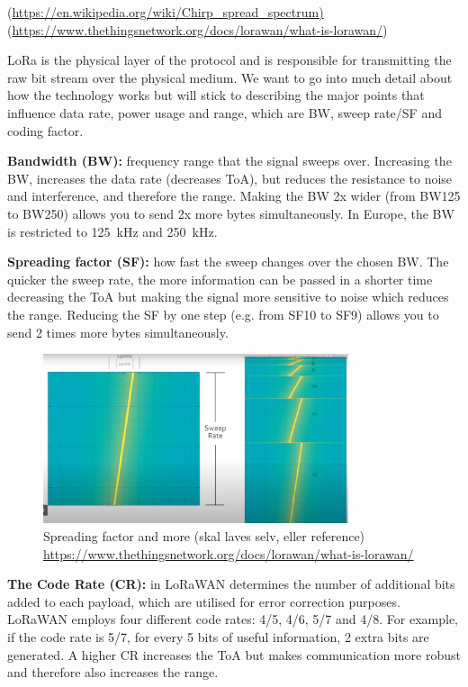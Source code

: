 (\url{https://en.wikipedia.org/wiki/Chirp_spread_spectrum)}
(\url{https://www.thethingsnetwork.org/docs/lorawan/what-is-lorawan/})

\ac{LoRa} is the physical layer of the protocol and is responsible for transmitting the raw bit stream over the physical medium.
We want to go into much detail about how the technology works but will stick to describing the major points that influence data rate, power usage and range, which are \ac{BW}, sweep rate/\ac{SF} and coding factor.

\textbf{Bandwidth (BW):} frequency range that the signal sweeps over. Increasing the \ac{BW}, increases the data rate (decreases \ac{ToA}), but reduces the resistance to noise and interference, and therefore the range. Making the \ac{BW} 2x wider (from BW125 to BW250) allows you to send 2x more bytes simultaneously.
In Europe, the \ac{BW} is restricted to \SI{125}{\kilo\hertz} and \SI{250}{\kilo\hertz}.

\textbf{Spreading factor (SF):} how fast the sweep changes over the chosen \ac{BW}. The quicker the sweep rate, the more information can be passed in a shorter time decreasing the \ac{ToA} but making the signal more sensitive to noise which reduces the range. Reducing the \ac{SF} by one step (e.g. from SF10 to SF9) allows you to send 2 times more bytes simultaneously.

\begin{figure}[H]
    \centering
    \includegraphics[width=0.8\textwidth]{figures/sweep_rate.png}
    \caption{Spreading factor and more (skal laves selv, eller reference) \url{https://www.thethingsnetwork.org/docs/lorawan/what-is-lorawan/}}
    \label{fig:spread_rate}
\end{figure}

\textbf{The Code Rate (CR):} in \ac{LoRaWAN} determines the number of additional bits added to each payload, which are utilised for error correction purposes. \ac{LoRaWAN} employs four different code rates: 4/5, 4/6, 5/7 and 4/8.
For example, if the code rate is 5/7, for every 5 bits of useful information, 2 extra bits are generated. A higher \ac{CR} increases the \ac{ToA} but makes communication more robust and therefore also increases the range.

